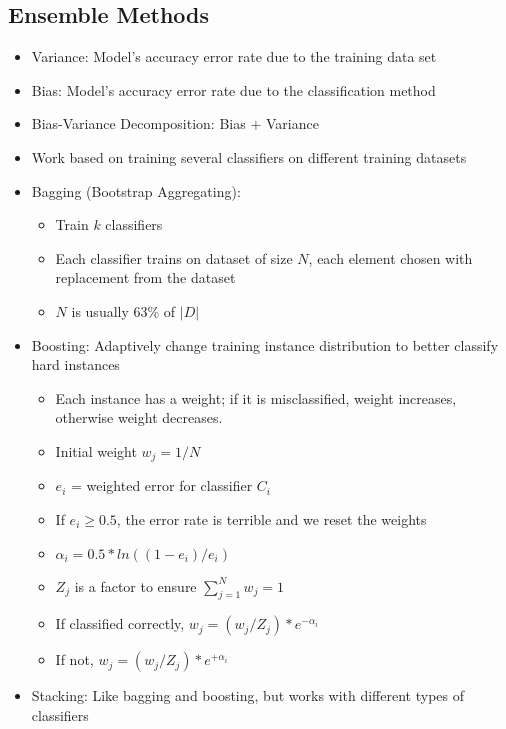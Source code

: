 \documentclass{article}
\begin{document}
\subsection{Ensemble Methods}
\begin{itemize}
	\item Variance: Model's accuracy error rate due to the training data set
	\item Bias: Model's accuracy error rate due to the classification method
	\item Bias-Variance Decomposition: Bias + Variance
	\item Work based on training several classifiers on different training datasets
	\item Bagging (Bootstrap Aggregating):
		\begin{itemize}
			\item Train $k$ classifiers
			\item Each classifier trains on dataset of size $N$, each element chosen with replacement from the dataset
			\item $N$ is usually 63\% of $|D|$
		\end{itemize}
	\item Boosting: Adaptively change training instance distribution to better classify hard instances
		\begin{itemize}
			\item Each instance has a weight; if it is misclassified, weight increases, otherwise weight decreases.
			\item Initial weight $w_j = 1/N$
			\item $e_i$ = weighted error for classifier $C_i$
			\item If $e_i \geq 0.5$, the error rate is terrible and we reset the weights
			\item $\alpha_i = 0.5 * ln( (1 - e_i) / e_i)$
			\item $Z_j$ is a factor to ensure $\sum_{j=1}^{N} w_j = 1$
			\item If classified correctly, $w_j = (w_j / Z_j) * e ^ {-\alpha_i}$
			\item If not, $w_j = (w_j / Z_j) * e ^ {+\alpha_i}$
		\end{itemize}
	\item Stacking: Like bagging and boosting, but works with different types of classifiers
\end{itemize}
\end{document}
